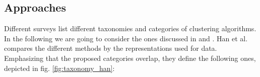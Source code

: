 \subsection{Approaches}\label{\positionnumber}
Different surveys list different taxonomies and categories of clustering algorithms. In the following we are going to consider the ones discussed in \cite{han2011data} and \cite{overview_clust}.
Han et al. compares the different methods by the representations used for data. Emphasizing that the proposed categories overlap, they define the following ones, depicted in fig. \ref{fig:taxonomy_han}:

